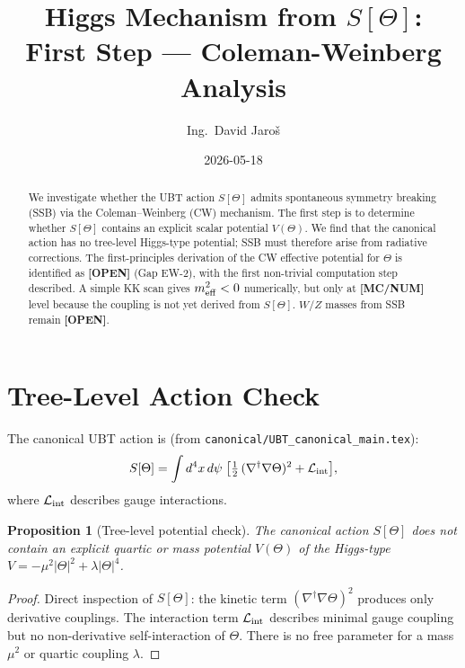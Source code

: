\documentclass[12pt,a4paper]{article}
\title{Higgs Mechanism from $S[\Theta]$:\\[4pt]
       First Step — Coleman-Weinberg Analysis}
\author{Ing.\ David Jaro\v{s}}
\date{2026-05-18}
\newtheorem{proposition}[theorem]{Proposition}
\begin{document}
\maketitle

\begin{abstract}
We investigate whether the UBT action $S[\Theta]$ admits spontaneous symmetry
breaking (SSB) via the Coleman--Weinberg (CW) mechanism.  The first step is
to determine whether $S[\Theta]$ contains an explicit scalar potential $V(\Theta)$.
We find that the canonical action has no tree-level Higgs-type potential;
SSB must therefore arise from radiative corrections.  The first-principles
derivation of the CW effective potential for $\Theta$ is identified as
\textbf{[OPEN]} (Gap EW-2), with the first non-trivial computation step described.
A simple KK scan gives $m_{\rm eff}^2<0$ numerically, but only at
\textbf{[MC/NUM]} level because the coupling is not yet derived from $S[\Theta]$.
$W/Z$ masses from SSB remain \textbf{[OPEN]}.
\end{abstract}

\tableofcontents

\section{Tree-Level Action Check}
\label{sec:tree_level}

The canonical UBT action is (from \texttt{canonical/UBT\_canonical\_main.tex}):
\[
  S[\Theta] = \int d^4x\,d\psi\;
  \bigl[\tfrac{1}{2}\,(\nabla^\dagger\nabla\Theta)^2
  + \mathcal{L}_{\rm int}\bigr],
\]
where $\mathcal{L}_{\rm int}$ describes gauge interactions.

\begin{proposition}[Tree-level potential check]
\label{prop:no_tree_potential}
The canonical action $S[\Theta]$ does \emph{not} contain an explicit
quartic or mass potential $V(\Theta)$ of the Higgs-type
$V = -\mu^2|\Theta|^2 + \lambda|\Theta|^4$.
\end{proposition}

\begin{proof}
Direct inspection of $S[\Theta]$: the kinetic term
$(\nabla^\dagger\nabla\Theta)^2$ produces only derivative couplings.
The interaction term $\mathcal{L}_{\rm int}$ describes minimal gauge coupling
but no non-derivative self-interaction of $\Theta$.
There is no free parameter for a mass $\mu^2$ or quartic coupling $\lambda$.
\end{proof}
\end{document}
